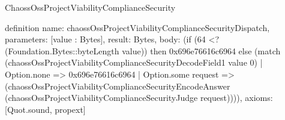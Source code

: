 \begin{lexlean}{ChaossOssProjectViabilityComplianceSecurity}
\begin{semanticmodule}
definition{
  name: chaossOssProjectViabilityComplianceSecurityDispatch,
  parameters: [value : Bytes],
  result: Bytes,
  body: (if (64 <? (Foundation.Bytes::byteLength value)) then 0x696e76616c6964 else (match (chaossOssProjectViabilityComplianceSecurityDecodeField1 value 0)
    | Option.none => 0x696e76616c6964
    | Option.some request => (chaossOssProjectViabilityComplianceSecurityEncodeAnswer (chaossOssProjectViabilityComplianceSecurityJudge request)))),
  axioms: [Quot.sound, propext]
}
\end{semanticmodule}
\end{lexlean}
